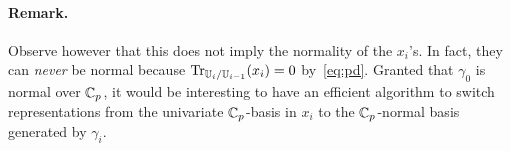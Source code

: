 \paragraph*{\bf Remark.} Observe however that this does not imply the
normality of the $x_i$'s. In fact, they can {\em never} be normal
because $\operatorname{Tr}_{\mathbb{U}_i/\mathbb{U}_{i-1}}(x_i) = 0$ by~\ref{eq:pd}.  Granted that
$\gamma_0$ is normal over $\mathbb{C}_p$, it would be interesting to have an
efficient algorithm to switch representations from the univariate
$\mathbb{C}_p$-basis in $x_i$ to the $\mathbb{C}_p$-normal basis generated by
$\gamma_i$.



%
